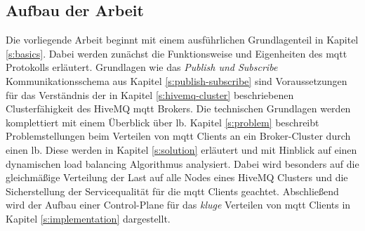 \subsection{Aufbau der Arbeit}
Die vorliegende Arbeit beginnt mit einem ausführlichen Grundlagenteil in Kapitel \ref{s:basics}. Dabei werden zunächst die Funktionsweise und Eigenheiten des \ac{mqtt} Protokolls erläutert.
Grundlagen wie das \textit{Publish und Subscribe} Kommunikationsschema aus Kapitel \ref{s:publish-subscribe} sind Voraussetzungen für das Verständnis der in Kapitel \ref{s:hivemq-cluster} beschriebenen Clusterfähigkeit des HiveMQ \acs{mqtt} Brokers.
Die technischen Grundlagen werden komplettiert mit einem Überblick über \acl{lb}.
Kapitel \ref{s:problem} beschreibt Problemstellungen beim Verteilen von \ac{mqtt} Clients an ein Broker-Cluster durch einen \acl{lb}.
Diese werden in Kapitel \ref{s:solution} erläutert und mit Hinblick auf einen dynamischen load balancing Algorithmus analysiert. Dabei wird besonders auf die gleichmä{\ss}ige Verteilung der Last auf alle Nodes eines HiveMQ Clusters und die Sicherstellung der Servicequalität für die \ac{mqtt} Clients geachtet.
Abschlie{\ss}end wird der Aufbau einer Control-Plane für das \textit{kluge} Verteilen von \ac{mqtt} Clients in Kapitel \ref{s:implementation} dargestellt.

\newpage
